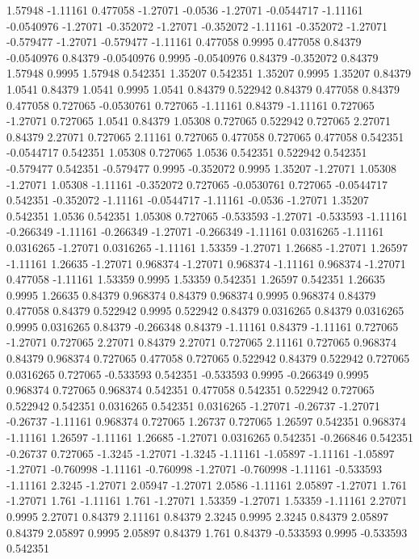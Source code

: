 1.57948 -1.11161
0.477058 -1.27071
-0.0536 -1.27071
-0.0544717 -1.11161
-0.0540976 -1.27071
-0.352072 -1.27071
-0.352072 -1.11161
-0.352072 -1.27071
-0.579477 -1.27071
-0.579477 -1.11161
0.477058 0.9995
0.477058 0.84379
-0.0540976 0.84379
-0.0540976 0.9995
-0.0540976 0.84379
-0.352072 0.84379
1.57948 0.9995
1.57948 0.542351
1.35207 0.542351
1.35207 0.9995
1.35207 0.84379
1.0541 0.84379
1.0541 0.9995
1.0541 0.84379
0.522942 0.84379
0.477058 0.84379
0.477058 0.727065
-0.0530761 0.727065
-1.11161 0.84379
-1.11161 0.727065
-1.27071 0.727065
1.0541 0.84379
1.05308 0.727065
0.522942 0.727065
2.27071 0.84379
2.27071 0.727065
2.11161 0.727065
0.477058 0.727065
0.477058 0.542351
-0.0544717 0.542351
1.05308 0.727065
1.0536 0.542351
0.522942 0.542351
-0.579477 0.542351
-0.579477 0.9995
-0.352072 0.9995
1.35207 -1.27071
1.05308 -1.27071
1.05308 -1.11161
-0.352072 0.727065
-0.0530761 0.727065
-0.0544717 0.542351
-0.352072 -1.11161
-0.0544717 -1.11161
-0.0536 -1.27071
1.35207 0.542351
1.0536 0.542351
1.05308 0.727065
-0.533593 -1.27071
-0.533593 -1.11161
-0.266349 -1.11161
-0.266349 -1.27071
-0.266349 -1.11161
0.0316265 -1.11161
0.0316265 -1.27071
0.0316265 -1.11161
1.53359 -1.27071
1.26685 -1.27071
1.26597 -1.11161
1.26635 -1.27071
0.968374 -1.27071
0.968374 -1.11161
0.968374 -1.27071
0.477058 -1.11161
1.53359 0.9995
1.53359 0.542351
1.26597 0.542351
1.26635 0.9995
1.26635 0.84379
0.968374 0.84379
0.968374 0.9995
0.968374 0.84379
0.477058 0.84379
0.522942 0.9995
0.522942 0.84379
0.0316265 0.84379
0.0316265 0.9995
0.0316265 0.84379
-0.266348 0.84379
-1.11161 0.84379
-1.11161 0.727065
-1.27071 0.727065
2.27071 0.84379
2.27071 0.727065
2.11161 0.727065
0.968374 0.84379
0.968374 0.727065
0.477058 0.727065
0.522942 0.84379
0.522942 0.727065
0.0316265 0.727065
-0.533593 0.542351
-0.533593 0.9995
-0.266349 0.9995
0.968374 0.727065
0.968374 0.542351
0.477058 0.542351
0.522942 0.727065
0.522942 0.542351
0.0316265 0.542351
0.0316265 -1.27071
-0.26737 -1.27071
-0.26737 -1.11161
0.968374 0.727065
1.26737 0.727065
1.26597 0.542351
0.968374 -1.11161
1.26597 -1.11161
1.26685 -1.27071
0.0316265 0.542351
-0.266846 0.542351
-0.26737 0.727065
-1.3245 -1.27071
-1.3245 -1.11161
-1.05897 -1.11161
-1.05897 -1.27071
-0.760998 -1.11161
-0.760998 -1.27071
-0.760998 -1.11161
-0.533593 -1.11161
2.3245 -1.27071
2.05947 -1.27071
2.0586 -1.11161
2.05897 -1.27071
1.761 -1.27071
1.761 -1.11161
1.761 -1.27071
1.53359 -1.27071
1.53359 -1.11161
2.27071 0.9995
2.27071 0.84379
2.11161 0.84379
2.3245 0.9995
2.3245 0.84379
2.05897 0.84379
2.05897 0.9995
2.05897 0.84379
1.761 0.84379
-0.533593 0.9995
-0.533593 0.542351
